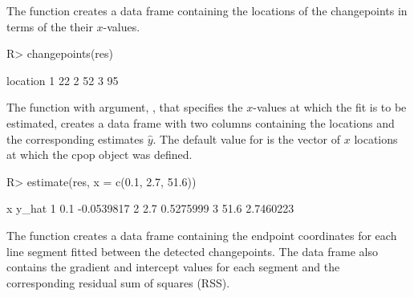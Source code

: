 \documentclass[article]{jss}
\begin{document}
The function 
creates a data frame containing the locations of the changepoints in terms of the their $x$-values.
\begin{CodeChunk}
\begin{CodeInput}
R> changepoints(res)
\end{CodeInput}
\begin{CodeOutput}
  location
1       22
2       52
3       95
\end{CodeOutput}
\end{CodeChunk}
%
%
%
%
The function  with argument,
 , that specifies the $x$-values at which the fit is to be estimated, creates a data frame with two columns containing the locations  and the corresponding estimates $\hat{y}$. The default value for  is the vector of $x$ locations at which the cpop object was defined.
\begin{CodeChunk}
\begin{CodeInput}
R> estimate(res, x = c(0.1, 2.7, 51.6))
\end{CodeInput}
\begin{CodeOutput}
   x      y_hat
1  0.1 -0.0539817
2  2.7  0.5275999
3 51.6  2.7460223

\end{CodeOutput}
\end{CodeChunk}
%
%
The function  creates a data frame containing the endpoint coordinates for each line segment fitted between the detected
changepoints. The data frame also contains the gradient and intercept values for each segment and the corresponding residual sum of squares (RSS).
\end{document}
